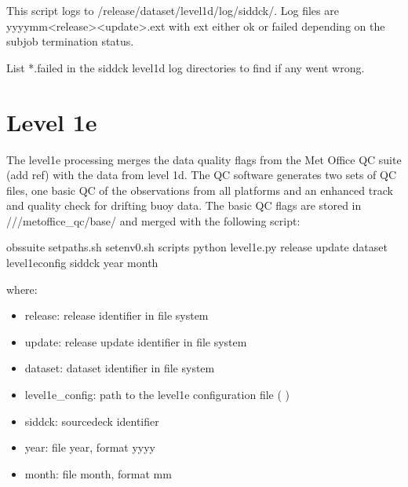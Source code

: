 \documentclass[letterpaper,10pt,english]{sphinxmanual}
\begin{document}
This script logs to /release/dataset/level1d/log/sid\sphinxhyphen{}dck/. Log files
are yyyy\sphinxhyphen{}mm\sphinxhyphen{}\textless{}release\textgreater{}\sphinxhyphen{}\textless{}update\textgreater{}.ext with ext either ok or failed depending on the
subjob termination status.

List  *.failed in the sid\sphinxhyphen{}dck level1d log directories to find if any went wrong.


\chapter{Level 1e}
\label{\detokenize{index:level-1e}}
The level1e processing merges the data quality flags from the Met Office QC
suite (add ref) with the data from level 1d. The QC software generates two sets
of QC files, one basic QC of the observations from all platforms and an enhanced
track and quality check for drifting buoy data. The basic QC flags are stored in
///metoffice\_qc/base/ and merged with the
following script:

\begin{sphinxVerbatim}[commandchars=\\\{\}]
 obs\PYGZhy{}suite
 setpaths.sh
 setenv0.sh
 scripts
python level1e.py  release update dataset level1e\PYGZus{}config sid\PYGZhy{}dck year month
\end{sphinxVerbatim}

where:
\begin{itemize}
\item {} 
release: release identifier in file system

\item {} 
update: release update identifier in file system

\item {} 
dataset: dataset identifier in file system

\item {} 
level1e\_config: path to the level1e configuration file ( {\hyperref[\detokenize{index:level1e-config-file}]{}})

\item {} 
sid\sphinxhyphen{}dck: source\sphinxhyphen{}deck identifier

\item {} 
year: file year, format yyyy

\item {} 
month: file month, format mm

\end{itemize}
\end{document}
